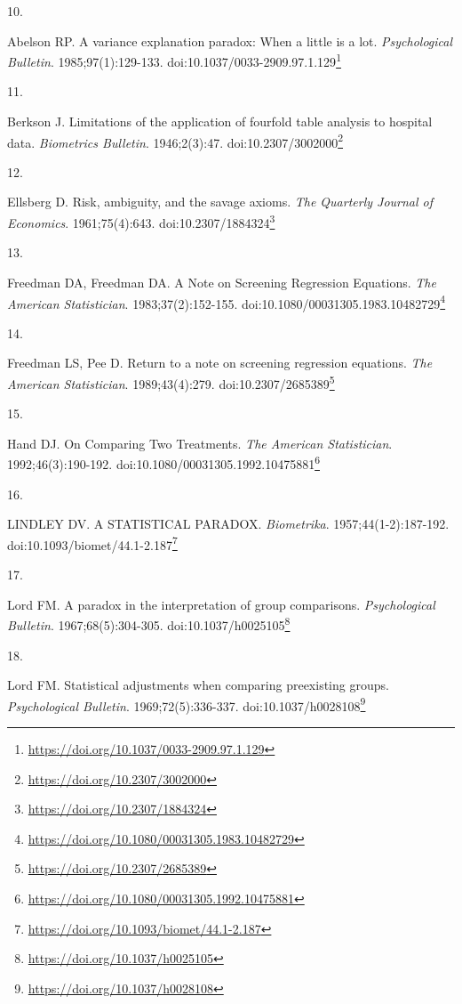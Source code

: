 \documentclass[
  a4paper,
]{book}
\newlength{\cslhangindent}
\newlength{\csllabelwidth}
\newlength{\cslentryspacingunit} %
\newenvironment{CSLReferences}[2] %
 {%
  \setlength{\parindent}{0pt}
  \ifodd #1
  \let\oldpar\par
  \def\par{\hangindent=\cslhangindent\oldpar}
  \fi
  \setlength{\parskip}{#2\cslentryspacingunit}
 }%
 {}
\newcommand{\CSLLeftMargin}[1]{\parbox[t]{\csllabelwidth}{#1}}
\newcommand{\CSLRightInline}[1]{\parbox[t]{\linewidth - \csllabelwidth}{#1}\break}
\renewcommand{\href}[2]{#2\footnote{\url{#1}}}
\begin{document}
\begin{CSLReferences}{0}{0}
\leavevmode{}%
\CSLLeftMargin{10. }%
\CSLRightInline{Abelson RP. A variance explanation paradox: When a little is a lot. \emph{Psychological Bulletin}. 1985;97(1):129-133. doi:\href{https://doi.org/10.1037/0033-2909.97.1.129}{10.1037/0033-2909.97.1.129}}

\leavevmode{}%
\CSLLeftMargin{11. }%
\CSLRightInline{Berkson J. Limitations of the application of fourfold table analysis to hospital data. \emph{Biometrics Bulletin}. 1946;2(3):47. doi:\href{https://doi.org/10.2307/3002000}{10.2307/3002000}}

\leavevmode{}%
\CSLLeftMargin{12. }%
\CSLRightInline{Ellsberg D. Risk, ambiguity, and the savage axioms. \emph{The Quarterly Journal of Economics}. 1961;75(4):643. doi:\href{https://doi.org/10.2307/1884324}{10.2307/1884324}}

\leavevmode{}%
\CSLLeftMargin{13. }%
\CSLRightInline{Freedman DA, Freedman DA. A Note on Screening Regression Equations. \emph{The American Statistician}. 1983;37(2):152-155. doi:\href{https://doi.org/10.1080/00031305.1983.10482729}{10.1080/00031305.1983.10482729}}

\leavevmode{}%
\CSLLeftMargin{14. }%
\CSLRightInline{Freedman LS, Pee D. Return to a note on screening regression equations. \emph{The American Statistician}. 1989;43(4):279. doi:\href{https://doi.org/10.2307/2685389}{10.2307/2685389}}

\leavevmode{}%
\CSLLeftMargin{15. }%
\CSLRightInline{Hand DJ. On Comparing Two Treatments. \emph{The American Statistician}. 1992;46(3):190-192. doi:\href{https://doi.org/10.1080/00031305.1992.10475881}{10.1080/00031305.1992.10475881}}

\leavevmode{}%
\CSLLeftMargin{16. }%
\CSLRightInline{LINDLEY DV. A STATISTICAL PARADOX. \emph{Biometrika}. 1957;44(1-2):187-192. doi:\href{https://doi.org/10.1093/biomet/44.1-2.187}{10.1093/biomet/44.1-2.187}}

\leavevmode{}%
\CSLLeftMargin{17. }%
\CSLRightInline{Lord FM. A paradox in the interpretation of group comparisons. \emph{Psychological Bulletin}. 1967;68(5):304-305. doi:\href{https://doi.org/10.1037/h0025105}{10.1037/h0025105}}

\leavevmode{}%
\CSLLeftMargin{18. }%
\CSLRightInline{Lord FM. Statistical adjustments when comparing preexisting groups. \emph{Psychological Bulletin}. 1969;72(5):336-337. doi:\href{https://doi.org/10.1037/h0028108}{10.1037/h0028108}}


\end{CSLReferences}
\end{document}
